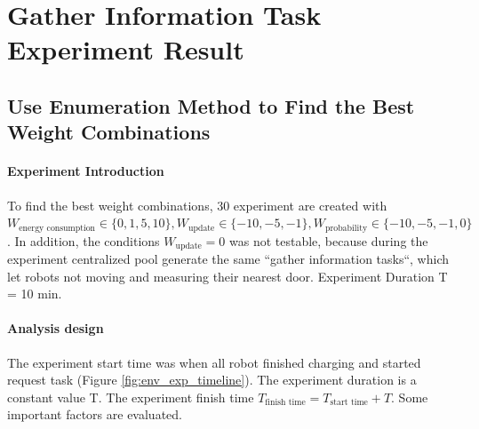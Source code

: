\section{Gather Information Task Experiment Result}
\label{sec:gather_info_task_experiments}

\subsection{Use Enumeration Method to Find the Best Weight Combinations}
\label{sec:gather_info_experiment_enumerate}
\paragraph{Experiment Introduction} 
To find the best weight combinations, 30 experiment are created with $W_{\mbox{energy consumption}} \in \{ 0,1,5,10 \}, W_{\mbox{update}} \in \{-10,-5,-1\}, W_{\mbox{probability}} \in \{-10,-5,-1,0\}$. In addition, the conditions $W_{\mbox{update}}=0$ was not testable, because during the experiment centralized pool generate the same ``gather information tasks``, which let robots not moving and measuring their nearest door. Experiment Duration T = 10 min.


\paragraph{Analysis design} The experiment start time was when all robot finished charging and started request task (Figure \ref{fig:env_exp_timeline}). The experiment duration is a constant value T. The experiment finish time $T_{\mbox{finish time}} = T_{\mbox{start time}} + T $. Some important factors are evaluated. 

